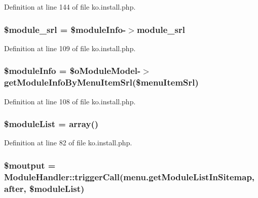 Definition at line 144 of file ko.\+install.\+php.

\hypertarget{ko_8install_8php_ae40aed4d7a99050245e66ca2a82949ed}{}
\subsubsection[{\$module\+\_\+srl}]{\setlength{\rightskip}{0pt plus 5cm}\${\bf module\+\_\+srl} = \$module\+Info-\/$>${\bf module\+\_\+srl}}\label{ko_8install_8php_ae40aed4d7a99050245e66ca2a82949ed}


Definition at line 109 of file ko.\+install.\+php.

\hypertarget{ko_8install_8php_ae3552a6dd49f37a50e7858151f7c5cc2}{}
\subsubsection[{\$module\+Info}]{\setlength{\rightskip}{0pt plus 5cm}\$module\+Info = \$o\+Module\+Model-\/$>$get\+Module\+Info\+By\+Menu\+Item\+Srl(\$menu\+Item\+Srl)}\label{ko_8install_8php_ae3552a6dd49f37a50e7858151f7c5cc2}


Definition at line 108 of file ko.\+install.\+php.

\hypertarget{ko_8install_8php_aaa80946d50e2d3677fbbc6d6c8a643c3}{}
\subsubsection[{\$module\+List}]{\setlength{\rightskip}{0pt plus 5cm}\$module\+List = array(\textquotesingle{})}\label{ko_8install_8php_aaa80946d50e2d3677fbbc6d6c8a643c3}


Definition at line 82 of file ko.\+install.\+php.

\hypertarget{ko_8install_8php_a2598d068355cca17645bc6bd70cc3a8c}{}
\subsubsection[{\$moutput}]{\setlength{\rightskip}{0pt plus 5cm}\$moutput = {\bf Module\+Handler\+::trigger\+Call}(\textquotesingle{}menu.\+get\+Module\+List\+In\+Sitemap\textquotesingle{}, \textquotesingle{}after\textquotesingle{}, \$module\+List)}\label{ko_8install_8php_a2598d068355cca17645bc6bd70cc3a8c}



